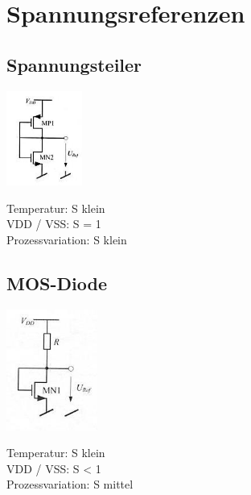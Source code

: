 \section{Spannungsreferenzen}

\begin{multicols}{2}
	\subsection{Spannungsteiler}
	\begin{minipage}{0.4\linewidth}
		\includegraphics[width=2.5cm]{images/FET_Spannungsteiler.png} \\
	\end{minipage}
	\begin{minipage}{0.6\linewidth}
		Temperatur: S klein \\
		VDD / VSS: S = 1 \\
		Prozessvariation: S klein \\
	\end{minipage}
	
	\subsection{MOS-Diode}
	\begin{minipage}{0.4\linewidth}
		\includegraphics[width=3cm]{images/Diode_Spannungsteiler.png} \\
	\end{minipage}
	\begin{minipage}{0.6\linewidth}
		Temperatur: S klein \\
		VDD / VSS: S < 1 \\
		Prozessvariation: S mittel \\
	\end{minipage}	


\end{multicols}
